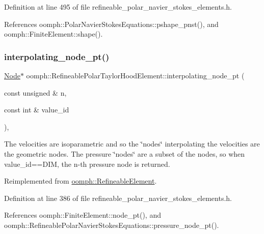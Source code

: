 Definition at line 495 of file refineable\+\_\+polar\+\_\+navier\+\_\+stokes\+\_\+elements.\+h.



References oomph\+::\+Polar\+Navier\+Stokes\+Equations\+::pshape\+\_\+pnst(), and oomph\+::\+Finite\+Element\+::shape().

\mbox{\label{classoomph_1_1RefineablePolarTaylorHoodElement_a6308630841a165e4152d0765ed468871}} 
\subsubsection{\texorpdfstring{interpolating\+\_\+node\+\_\+pt()}{interpolating\_node\_pt()}}
{\footnotesize\ttfamily \hyperlink{classoomph_1_1Node}{Node}$\ast$ oomph\+::\+Refineable\+Polar\+Taylor\+Hood\+Element\+::interpolating\+\_\+node\+\_\+pt (\begin{DoxyParamCaption}\item[{const unsigned \&}]{n,  }\item[{const int \&}]{value\+\_\+id }\end{DoxyParamCaption})\hspace{0.3cm}{\ttfamily [inline]}, {\ttfamily [virtual]}}



The velocities are isoparametric and so the \char`\"{}nodes\char`\"{} interpolating the velocities are the geometric nodes. The pressure \char`\"{}nodes\char`\"{} are a subset of the nodes, so when value\+\_\+id==D\+IM, the n-\/th pressure node is returned. 



Reimplemented from \hyperlink{classoomph_1_1RefineableElement_ab27986fc2f6033a4758662cde78a7b76}{oomph\+::\+Refineable\+Element}.



Definition at line 386 of file refineable\+\_\+polar\+\_\+navier\+\_\+stokes\+\_\+elements.\+h.



References oomph\+::\+Finite\+Element\+::node\+\_\+pt(), and oomph\+::\+Refineable\+Polar\+Navier\+Stokes\+Equations\+::pressure\+\_\+node\+\_\+pt().


